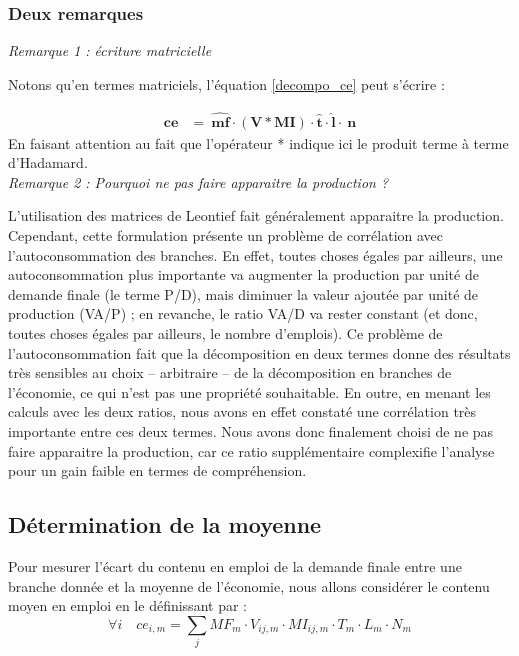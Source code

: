\subsubsection{Deux remarques}

\emph{Remarque 1 : écriture matricielle}

Notons qu'en termes matriciels, l'équation \ref{decompo_ce} peut s'écrire : 

\begin{align*}
\pmb{ce} &=~\widehat{\pmb{mf}} \cdot \left( \pmb{V}  * \pmb{MI} \right) \cdot \widehat{ \pmb{t}} \cdot \widehat{\pmb{l}} \cdot~\pmb{n}  
\end{align*}
En faisant attention au fait que l'opérateur * indique ici le produit terme à terme d'Hadamard.\\

\emph{Remarque 2 : Pourquoi ne pas faire apparaitre la production ?}

L’utilisation des matrices de Leontief fait généralement apparaitre la production. 
Cependant, cette formulation présente un problème de corrélation avec l’autoconsommation des branches. 
En effet, toutes choses égales par ailleurs, une autoconsommation plus importante va augmenter la production par unité de demande finale (le terme P/D), mais diminuer la valeur ajoutée par unité de production (VA/P) ; en revanche, le ratio VA/D va rester constant (et donc, toutes choses égales par ailleurs, le nombre d’emplois). 
Ce problème de l’autoconsommation fait que la décomposition en deux termes donne des résultats très sensibles au choix – arbitraire – de la décomposition en branches de l’économie, ce qui n’est pas une propriété souhaitable. 
En outre, en menant les calculs avec les deux ratios, nous avons en effet constaté une corrélation très importante entre ces deux termes. 
Nous avons donc finalement choisi de ne pas faire apparaitre la production, car ce ratio supplémentaire complexifie l’analyse pour un gain faible en termes de compréhension.


\cleardoublepage
\subsection{Détermination de la moyenne}
\label{app:def_moyenne}

Pour mesurer l’écart du contenu en emploi de la demande finale entre une branche donnée et la moyenne de l’économie, nous allons considérer le contenu moyen en emploi en le définissant par :
\begin{equation}
\forall i \quad ce_{i,m} = \sum_j MF_m \cdot V_{ij,m} \cdot MI_{ij,m} \cdot T_m \cdot L_m \cdot N_m
\end{equation}


